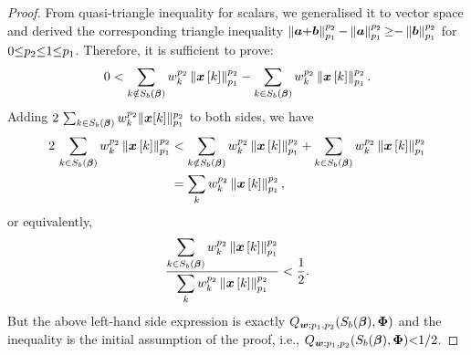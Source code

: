 \begin{proof}
From quasi-triangle inequality for scalars, we generalised it to vector space and derived the corresponding triangle inequality $\left\lVert\boldsymbol{a} {+} \boldsymbol{b}\right\rVert_{p_1}^{p_2} {-} \left\lVert\boldsymbol{a}\right\rVert_{p_1}^{p_2} {\geq} {-}\left\lVert\boldsymbol{b}\right\rVert_{p_1}^{p_2}$ for $0 {\leq} p_2 {\leq} 1 {\leq} p_1$.
Therefore, it is sufficient to prove:
\begin{equation*}
 0 < \displaystyle\sum_{k \notin S_b\left( \boldsymbol{\beta} \right)} w_k^{p_2} \left\lVert\boldsymbol{x}\left[ k \right]\right\rVert_{p_1}^{p_2} - \displaystyle\sum_{k \in S_b\left( \boldsymbol{\beta} \right)} w_k^{p_2} \left\lVert\boldsymbol{x}\left[ k \right]\right\rVert_{p_1}^{p_2}.
\end{equation*}
Adding $2 \, \sum_{k \in S_b(\boldsymbol{\beta})} w_k^{p_2} \Vert \boldsymbol{x}[k] \Vert_{p_1}^{p_2}$ to both sides, we have
\begin{gather*}
\begin{aligned}
2 \, \displaystyle\sum_{k \in S_b\left( \boldsymbol{\beta} \right)} w_k^{p_2} \left\lVert\boldsymbol{x}\left[ k \right]\right\rVert_{p_1}^{p_2} &< 
\displaystyle\sum_{k \notin S_b\left( \boldsymbol{\beta} \right)} w_k^{p_2} \left\lVert\boldsymbol{x}\left[ k \right]\right\rVert_{p_1}^{p_2} + \displaystyle\sum_{k \in S_b\left( \boldsymbol{\beta} \right)} w_k^{p_2} \left\lVert\boldsymbol{x}\left[ k \right]\right\rVert_{p_1}^{p_2} \\
&= \displaystyle\sum_{k} w_k^{p_2} \left\lVert\boldsymbol{x}\left[ k \right]\right\rVert_{p_1}^{p_2},
\end{aligned}
\end{gather*}
or equivalently,
\begin{equation*}
\frac{\displaystyle\sum_{k \in S_b\left( \boldsymbol{\beta} \right)} w_k^{p_2} \left\lVert\boldsymbol{x}\left[ k \right]\right\rVert_{p_1}^{p_2}}{\displaystyle\sum_{k} w_k^{p_2} \left\lVert\boldsymbol{x}\left[ k \right]\right\rVert_{p_1}^{p_2}} < \frac12.
\end{equation*}
But the above left-hand side expression is exactly $Q_{\boldsymbol{w};p_1,p_2}(S_b(\boldsymbol{\beta}),\boldsymbol{\Phi})$ and the inequality is the initial assumption of the proof, i.e., $Q_{\boldsymbol{w};p_1,p_2}(S_b(\boldsymbol{\beta}),\boldsymbol{\Phi}) {<} 1/2$.




\end{proof}
